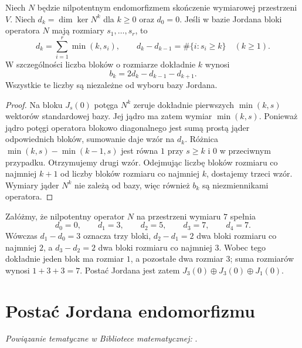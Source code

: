 \begin{stwierdzenie}
\label{prop:lin17-nilpotent-sizes}
Niech \(N\) będzie nilpotentnym endomorfizmem
skończenie wymiarowej przestrzeni \(V\).
Niech \(d_k=\dim\ker N^k\) dla \(k\ge0\)
oraz \(d_0=0\).
Jeśli w bazie Jordana bloki operatora \(N\)
mają rozmiary \(s_1,\ldots,s_r\), to
\[
 d_k=\sum_{i=1}^r\min(k,s_i),
 \qquad
 d_k-d_{k-1}=\#\{i:s_i\ge k\}
 \quad(k\ge1).
\]
W szczególności liczba bloków o rozmiarze
dokładnie \(k\) wynosi
\[
 b_k=2d_k-d_{k-1}-d_{k+1}.
\]
Wszystkie te liczby są niezależne
od wyboru bazy Jordana.
\end{stwierdzenie}
\begin{proof}
Na bloku \(J_s(0)\) potęga \(N^k\)
zeruje dokładnie pierwszych \(\min(k,s)\)
wektorów standardowej bazy.
Jej jądro ma zatem wymiar \(\min(k,s)\).
Ponieważ jądro potęgi operatora blokowo
diagonalnego jest sumą prostą jąder
odpowiednich bloków, sumowanie daje wzór na \(d_k\).
Różnica \(\min(k,s)-\min(k-1,s)\)
jest równa \(1\) przy \(s\ge k\)
i \(0\) w przeciwnym przypadku.
Otrzymujemy drugi wzór.
Odejmując liczbę bloków rozmiaru co najmniej \(k+1\)
od liczby bloków rozmiaru co najmniej \(k\),
dostajemy trzeci wzór.
Wymiary jąder \(N^k\)
nie zależą od bazy, więc również \(b_k\)
są niezmiennikami operatora.
\end{proof}

\begin{przyklad}
\label{prz:lin17-kernel-sizes}
Załóżmy, że nilpotentny operator \(N\)
na przestrzeni wymiaru \(7\) spełnia
\[
 d_0=0,\qquad d_1=3,\qquad d_2=5,
 \qquad d_3=7,\qquad d_4=7.
\]
Wówczas \(d_1-d_0=3\) oznacza
trzy bloki, \(d_2-d_1=2\)
dwa bloki rozmiaru co najmniej \(2\),
a \(d_3-d_2=2\) dwa bloki
rozmiaru co najmniej \(3\).
Wobec tego dokładnie jeden blok
ma rozmiar \(1\), a pozostałe dwa
rozmiar \(3\); suma rozmiarów wynosi \(1+3+3=7\).
Postać Jordana jest zatem
\(J_3(0)\oplus J_3(0)\oplus J_1(0)\).
\end{przyklad}

\section{Postać Jordana endomorfizmu}
\label{sec:lin17-general-jordan}

\noindent\emph{Powiązanie tematyczne w Bibliotece matematycznej:} .


